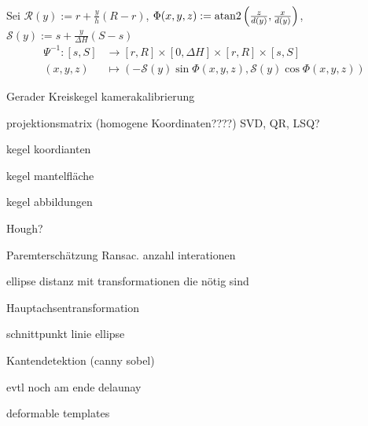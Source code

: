Sei $\mathcal{R}(y) := r + \frac{y}{h} (R - r)$, $\Phi(x,y,z) := \text{atan2}\left(\frac{z}{d(y)}, \frac{x}{d(y)}\right)$, $\mathcal{S}(y) := s + \frac{y}{\Delta H} (S-s)$
\begin{equation}
\begin{aligned}
\Psi^{-1} \colon  [s,S] &\to [r,R] \times [0, \Delta H] \times [r,R]\times [s,S]\\
(x,y,z) &\mapsto \left(-\mathcal{S}(y)\sin \Phi(x,y,z), \mathcal{S}(y)\cos\Phi(x,y,z)\right) 
\end{aligned}
\end{equation}




\newpage

Gerader Kreiskegel
kamerakalibrierung

projektionsmatrix
(homogene Koordinaten????)
SVD, QR, LSQ?

kegel koordianten

kegel mantelfläche

kegel abbildungen

Hough?

Paremterschätzung Ransac. anzahl interationen

ellipse distanz mit transformationen die nötig sind

Hauptachsentransformation

schnittpunkt linie ellipse


Kantendetektion (canny sobel)


evtl noch am ende delaunay

deformable templates